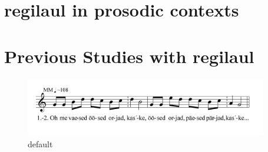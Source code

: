%
%
%
%
%
%
% 
% 
 
 \cite{tormisProblemsThatRegilaul2007}
\section{regilaul in prosodic contexts}



\cite{lehistePhoneticsMetrics1992}








 
 
\section{Previous Studies with regilaul}

\begin{figure}[htbp]
\begin{center}
\includegraphics[width=300pt]{figures/069.png}
\caption{default}
\label{default}
\end{center}
\end{figure}

\cite{rossStudyTimingEstonian1989,rossLostProsodicOppositions1994,rossTradeoffQuantityStress1996,sargDoesMelodicAccent2006, sargMelodicAccentEstonian2007,orasMusicalManifestationsTextual2011}

